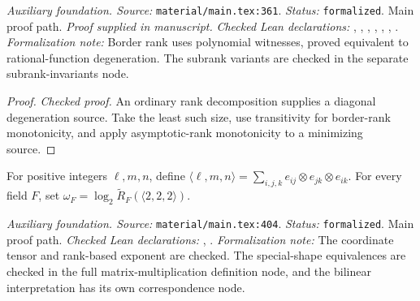 \noindent\textit{Auxiliary foundation. Source:} \texttt{material/main.tex:361}.
\textit{Status:} \texttt{formalized}. Main proof path.
\textit{Proof supplied in manuscript.}
\textit{Checked Lean declarations:} , , , , , , .
\textit{Formalization note:} Border rank uses polynomial witnesses, proved equivalent to rational-function degeneration. The subrank variants are checked in the separate subrank-invariants node.

\begin{proof}
\leanok
{}
\textit{Checked proof.} An ordinary rank decomposition supplies a diagonal degeneration source. Take the least such size, use transitivity for border-rank monotonicity, and apply asymptotic-rank monotonicity to a minimizing source.
\end{proof}

\renewcommand{\thetheorem}{A34}
\begin{definition}
\label{aux:matrix-multiplication-exponent}
\leanok
{}
For positive integers $\ell,m,n$, define $\langle\ell,m,n\rangle=\sum_{i,j,k}e_{ij}\otimes e_{jk}\otimes e_{ik}$. For every field $F$, set $\omega_F=\log_2\widetilde R_F(\langle2,2,2\rangle)$.
\end{definition}

\noindent\textit{Auxiliary foundation. Source:} \texttt{material/main.tex:404}.
\textit{Status:} \texttt{formalized}. Main proof path.
\textit{Checked Lean declarations:} , .
\textit{Formalization note:} The coordinate tensor and rank-based exponent are checked. The special-shape equivalences are checked in the full matrix-multiplication definition node, and the bilinear interpretation has its own correspondence node.


